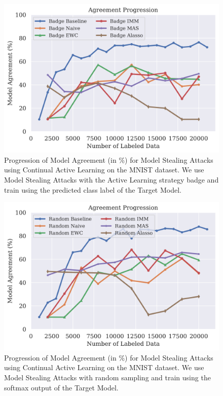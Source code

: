 \begin{figure}[h]
    \centering
    \includegraphics[width=0.7\linewidth]{images/results_CALMS/mnist_label_badge.png}
    \caption[Agreement Comparison for Model Stealing on MNIST using the predicted class label and the Active Learning strategy Badge]{Progression of Model Agreement
    (in \%) for Model Stealing Attacks using Continual Active Learning on the MNIST dataset. We use Model Stealing Attacks with the Active Learning strategy
    \gls{badge} and train using the predicted class label of the Target Model.}
    \label{fig:CALMSMNISTLabelBadge}
\end{figure}

\begin{figure}[h]
    \centering
    \includegraphics[width=0.7\linewidth]{images/results_CALMS/mnist_softmax_random.png}
    \caption[Agreement Comparison for Model Stealing on MNIST using the softmax output and the Active Learning strategy Random]{Progression of Model Agreement
    (in \%) for Model Stealing Attacks using Continual Active Learning on the MNIST dataset. We use Model Stealing Attacks with random sampling and train
    using the softmax output of the Target Model.}
    \label{fig:CALMSMNISTSoftmaxRandom}
\end{figure}

